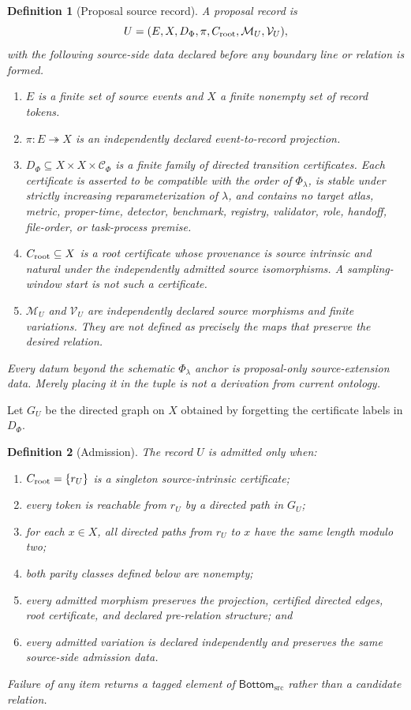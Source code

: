 \documentclass[11pt]{article}
\newtheorem{definition}{Definition}
\newcommand{\Bottom}{\mathsf{Bottom}_{\mathrm{src}}}
\begin{document}
\begin{definition}[Proposal source record]
A proposal record is
\[
 U=(E,X,D_\Phi,\pi,C_{\rm root},\mathcal M_U,\mathcal V_U),
\]
with the following source-side data declared before any boundary line or
relation is formed.
\begin{enumerate}[label=(\roman*)]
  \item \(E\) is a finite set of source events and \(X\) a finite nonempty set
  of record tokens.
  \item \(\pi:E\twoheadrightarrow X\) is an independently declared
  event-to-record projection.
  \item \(D_\Phi\subseteq X\times X\times\mathcal C_\Phi\) is a finite family
  of directed transition certificates. Each certificate is asserted to be
  compatible with the order of \(\Phi_\lambda\), is stable under strictly
  increasing reparameterization of \(\lambda\), and contains no target atlas,
  metric, proper-time, detector, benchmark, registry, validator, role,
  handoff, file-order, or task-process premise.
  \item \(C_{\rm root}\subseteq X\) is a root certificate whose provenance is
  source intrinsic and natural under the independently admitted source
  isomorphisms. A sampling-window start is not such a certificate.
  \item \(\mathcal M_U\) and \(\mathcal V_U\) are independently declared
  source morphisms and finite variations. They are not defined as precisely
  the maps that preserve the desired relation.
\end{enumerate}
Every datum beyond the schematic \(\Phi_\lambda\) anchor is proposal-only
source-extension data. Merely placing it in the tuple is not a derivation from
current ontology.
\end{definition}

Let \(G_U\) be the directed graph on \(X\) obtained by forgetting the
certificate labels in \(D_\Phi\).

\begin{definition}[Admission]
The record \(U\) is \emph{admitted} only when:
\begin{enumerate}[label=(A\arabic*)]
  \item \(C_{\rm root}=\{r_U\}\) is a singleton source-intrinsic certificate;
  \item every token is reachable from \(r_U\) by a directed path in \(G_U\);
  \item for each \(x\in X\), all directed paths from \(r_U\) to \(x\) have
  the same length modulo two;
  \item both parity classes defined below are nonempty;
  \item every admitted morphism preserves the projection, certified directed
  edges, root certificate, and declared pre-relation structure; and
  \item every admitted variation is declared independently and preserves the
  same source-side admission data.
\end{enumerate}
Failure of any item returns a tagged element of \(\Bottom\) rather than a
candidate relation.
\end{definition}
\end{document}
